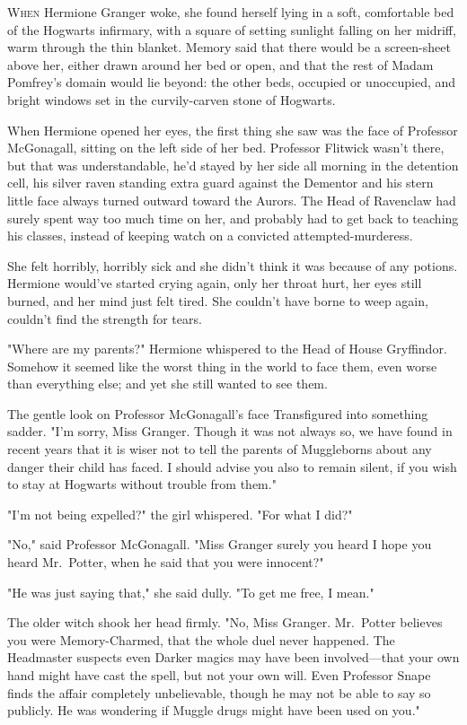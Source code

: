 
\lettrine{W}{hen} Hermione
Granger woke, she found herself lying in a soft, comfortable bed of the
Hogwarts infirmary, with a square of setting sunlight falling on her midriff,
warm through the thin blanket. Memory said that there would be a screen-sheet
above her, either drawn around her bed or open, and that the rest of Madam
Pomfrey's domain would lie beyond: the other beds, occupied or unoccupied, and
bright windows set in the curvily-carven stone of Hogwarts.

When Hermione opened her eyes, the first thing she saw was the face of
Professor McGonagall, sitting on the left side of her bed. Professor Flitwick
wasn't there, but that was understandable, he'd stayed by her side all morning
in the detention cell, his silver raven standing extra guard against the
Dementor and his stern little face always turned outward toward the Aurors. The
Head of Ravenclaw had surely spent way too much time on her, and probably had
to get back to teaching his classes, instead of keeping watch on a convicted
attempted-murderess.

She felt horribly, horribly sick and she didn't think it was because of any
potions. Hermione would've started crying again, only her throat hurt, her eyes
still burned, and her mind just felt tired. She couldn't have borne to weep
again, couldn't find the strength for tears.

"Where are my parents?" Hermione whispered to the Head of House Gryffindor.
Somehow it seemed like the worst thing in the world to face them, even worse
than everything else; and yet she still wanted to see them.

The gentle look on Professor McGonagall's face Transfigured into something
sadder. "I'm sorry, Miss Granger. Though it was not always so, we have found in
recent years that it is wiser not to tell the parents of Muggleborns about any
danger their child has faced. I should advise you also to remain silent, if you
wish to stay at Hogwarts without trouble from them."

"I'm not being expelled?" the girl whispered. "For what I did?"

"No," said Professor McGonagall. "Miss Granger{\el} surely you heard{\el}
I hope you heard Mr.~Potter, when he said that you were innocent?"

"He was just saying that," she said dully. "To get me free, I mean."

The older witch shook her head firmly. "No, Miss Granger. Mr.~Potter believes
you were Memory-Charmed, that the whole duel never happened. The Headmaster
suspects even Darker magics may have been involved---that your own hand might
have cast the spell, but not your own will. Even Professor Snape finds the
affair completely unbelievable, though he may not be able to say so publicly.
He was wondering if Muggle drugs might have been used on you."

